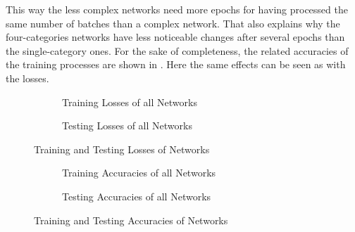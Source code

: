 This way the less complex networks need more epochs for having processed the same number of batches than a complex network.
That also explains why the four-categories networks have less noticeable changes after several epochs than the single-category ones.
For the sake of completeness, the related accuracies of the training processes are shown in .
Here the same effects can be seen as with the losses.
\begin{figure}
	\setlength{}
	\setlength{}
	\centering
	\begin{subfigure}{\textwidth}
		\centering
		
		\caption{Training Losses of all Networks}
		\label{fig:train-loss}
	\end{subfigure}
	\begin{subfigure}{\textwidth}
		\centering
		
		\caption{Testing Losses of all Networks}
		\label{fig:test-loss}
	\end{subfigure}
	\caption{Training and Testing Losses of Networks}
	\label{fig:networks-loss}
\end{figure}
\begin{figure}
	\setlength{}
	\setlength{}
	\centering
	\begin{subfigure}{\textwidth}
		\centering
		
		\caption{Training Accuracies of all Networks}
		\label{fig:train-accuracy}
	\end{subfigure}
	\begin{subfigure}{\textwidth}
		\centering
		
		\caption{Testing Accuracies of all Networks}
		\label{fig:test-accuracy}
	\end{subfigure}
	\caption{Training and Testing Accuracies of Networks}
	\label{fig:networks-accuracy}
\end{figure}